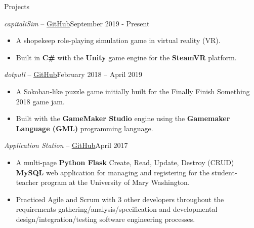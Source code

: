 \documentclass[calibri]{mcdowellcv}
\begin{document}
	\begin{cvsection}{Projects}
		\begin{cvsubsection}{\textit{capitaliSim} -- \href{https://github.com/acarlyle/shopvr}{\underline{GitHub}}}{September 2019 - Present}	
			\begin{itemize}
				\item A shopekeep role-playing simulation game in virtual reality (VR).
				\item Built in \textbf{C\#} with the \textbf{Unity} game engine for the \textbf{SteamVR} platform.  
			\end{itemize}
		\end{cvsubsection}
		
		\begin{cvsubsection}{\textit{dotpull} -- \href{https://github.com/acarlyle/dotpull}{\underline{GitHub}}}{February 2018 -- April 2019}	
			\begin{itemize}
				\item A Sokoban-like puzzle game initially built for the Finally Finish Something 2018 game jam.  
				\item Built with the \textbf{GameMaker Studio} engine using the \textbf{Gamemaker Language (GML)} programming language.  
			\end{itemize}
		\end{cvsubsection}
		
		\begin{cvsubsection}{\textit{Application Station} -- \href{https://github.com/acarlyle/InformationStation}{\underline{GitHub}}}{April 2017}		
			\begin{itemize}
				\item A multi-page \textbf{Python Flask} Create, Read, Update, Destroy (CRUD) \textbf{MySQL} web application for managing and registering for the student-teacher program at the University of Mary Washington.   
				\item Practiced Agile and Scrum with 3 other developers throughout the requirements gathering/analysis/specification and developmental design/integration/testing software engineering processes. 
			\end{itemize}
		\end{cvsubsection}
	\end{cvsection}
\end{document}

